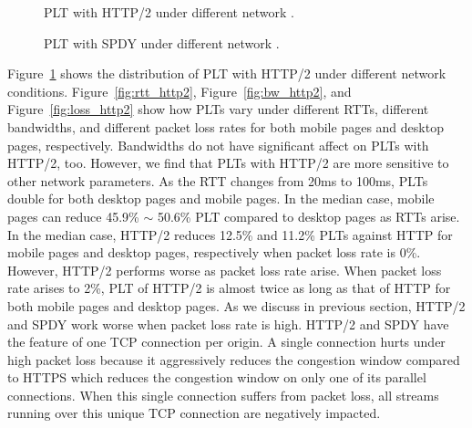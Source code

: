 \begin{figure}[htbp]
\centering
{}
\caption{PLT with HTTP/2 under different network .}
\label{fig:plt_with_http2}
\end{figure}

\begin{figure}[htbp]
\centering
{}
\caption{PLT with SPDY under different network .}
\label{fig:plt_with_spdy}
\end{figure}

Figure~\ref{fig:plt_with_http2} shows the distribution of PLT with HTTP/2 under different network conditions. Figure~\ref{fig:rtt_http2}, Figure~\ref{fig:bw_http2}, and Figure~\ref{fig:loss_http2} show how PLTs vary under different RTTs, different bandwidths, and different packet loss rates for both mobile pages and desktop pages, respectively. Bandwidths do not have significant affect on PLTs with HTTP/2, too. However, we find that PLTs with HTTP/2 are more sensitive to other network parameters. As the RTT changes from 20ms to 100ms, PLTs double for both desktop pages and mobile pages. In the median case, mobile pages can reduce 45.9\% $\sim$ 50.6\% PLT compared to desktop pages as RTTs arise. In the median case, HTTP/2 reduces 12.5\% and 11.2\% PLTs against HTTP for mobile pages and desktop pages, respectively when packet loss rate is 0\%. However, HTTP/2 performs worse as packet loss rate arise. When packet loss rate arises to 2\%, PLT of HTTP/2 is almost twice as long as that of HTTP for both mobile pages and desktop pages. As we discuss in previous section, HTTP/2 and SPDY work worse when packet loss rate is high. HTTP/2 and SPDY have the feature of one TCP connection per origin. A single connection hurts under high packet loss because it aggressively reduces the congestion window compared to HTTPS which reduces the congestion window on only one of its parallel connections. When this single connection suffers from packet loss, all streams running over this unique TCP connection are negatively impacted.




